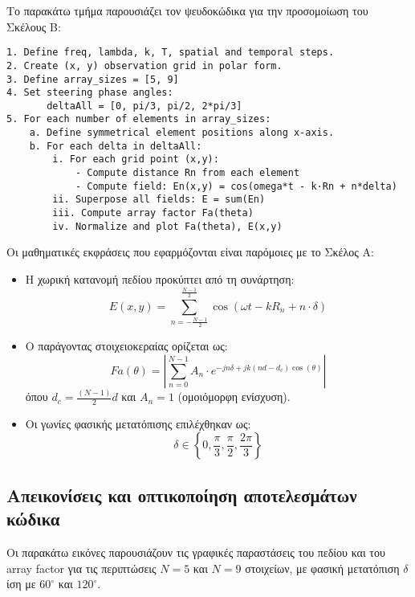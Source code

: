 \documentclass[a4paper,12pt]{report}
\newcommand{\en}{\selectlanguage{english}}
\newcommand{\gr}{\selectlanguage{greek}}
\begin{document}
Το παρακάτω τμήμα παρουσιάζει τον ψευδοκώδικα για την προσομοίωση του Σκέλους B:

\begin{tcolorbox}[colback=gray!5!white, colframe=black!75!black, title=Ψευδοκώδικας \en \texttt{BeamRotation\_MultiSize} \gr]

\en
\begin{verbatim}
1. Define freq, lambda, k, T, spatial and temporal steps.
2. Create (x, y) observation grid in polar form.
3. Define array_sizes = [5, 9]
4. Set steering phase angles:
       deltaAll = [0, pi/3, pi/2, 2*pi/3]
5. For each number of elements in array_sizes:
    a. Define symmetrical element positions along x-axis.
    b. For each delta in deltaAll:
        i. For each grid point (x,y):
            - Compute distance Rn from each element
            - Compute field: En(x,y) = cos(omega*t - k·Rn + n*delta)
        ii. Superpose all fields: E = sum(En)
        iii. Compute array factor Fa(theta)
        iv. Normalize and plot Fa(theta), E(x,y)
\end{verbatim}
\gr
\end{tcolorbox}

\hspace{-0.6cm}Οι μαθηματικές εκφράσεις που εφαρμόζονται είναι παρόμοιες με το Σκέλος Α:

\begin{itemize}
    \item Η χωρική κατανομή πεδίου προκύπτει από τη συνάρτηση:
    \[
    E(x, y) = \sum_{n = -\frac{N-1}{2}}^{\frac{N-1}{2}} \cos(\omega t - k R_n + n \cdot \delta)
    \]
    \item Ο παράγοντας στοιχειοκεραίας ορίζεται ως:
    \[
    Fa(\theta) = \left| \sum_{n=0}^{N-1} A_n \cdot e^{-j n \delta + j k (n d - d_c) \cos(\theta)} \right|
    \]
    όπου \( d_c = \frac{(N-1)}{2}d \) και \( A_n = 1 \) (ομοιόμορφη ενίσχυση).
    \item Οι γωνίες φασικής μετατόπισης επιλέχθηκαν ως:
    \[
    \delta \in \left\{ 0, \frac{\pi}{3}, \frac{\pi}{2}, \frac{2\pi}{3} \right\}
    \]
\end{itemize}

\subsection{Απεικονίσεις και οπτικοποίηση αποτελεσμάτων κώδικα}

Οι παρακάτω εικόνες παρουσιάζουν τις γραφικές παραστάσεις του πεδίου και του array factor για τις περιπτώσεις \( N = 5 \) και \( N = 9 \) στοιχείων, με φασική μετατόπιση \( \delta \) ίση με \( 60^\circ \) και \( 120^\circ \).
\end{document}
